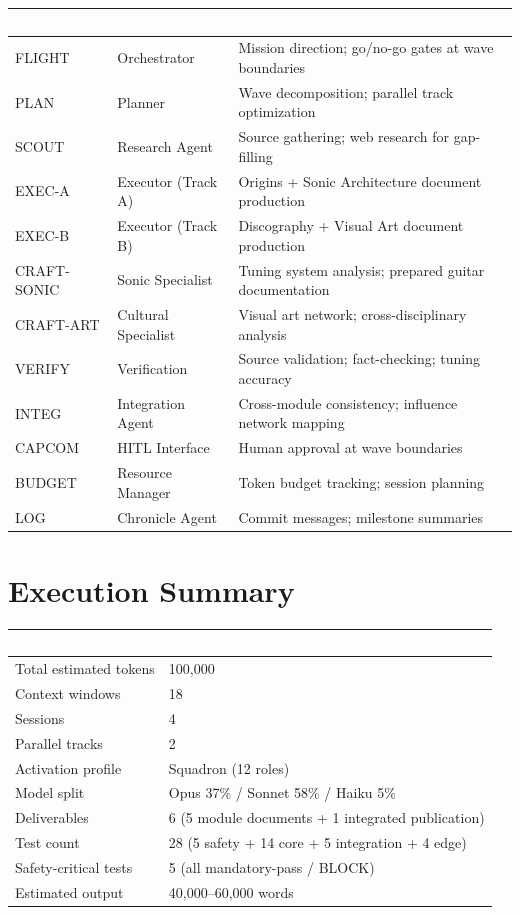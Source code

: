 \documentclass[11pt,letterpaper]{article}
\newcommand{\tableheader}[1]{\textbf{\sffamily\textcolor{white}{#1}}}
\begin{document}
\begin{center}
\begin{tabularx}{\textwidth}{L{2cm}L{3cm}X}
\toprule
{}
\tableheader{Role} & \tableheader{Agent} & \tableheader{Responsibility} \\
\midrule
FLIGHT & Orchestrator & Mission direction; go/no-go gates at wave boundaries \\
PLAN & Planner & Wave decomposition; parallel track optimization \\
SCOUT & Research Agent & Source gathering; web research for gap-filling \\
EXEC-A & Executor (Track A) & Origins + Sonic Architecture document production \\
EXEC-B & Executor (Track B) & Discography + Visual Art document production \\
CRAFT-SONIC & Sonic Specialist & Tuning system analysis; prepared guitar documentation \\
CRAFT-ART & Cultural Specialist & Visual art network; cross-disciplinary analysis \\
VERIFY & Verification & Source validation; fact-checking; tuning accuracy \\
INTEG & Integration Agent & Cross-module consistency; influence network mapping \\
CAPCOM & HITL Interface & Human approval at wave boundaries \\
BUDGET & Resource Manager & Token budget tracking; session planning \\
LOG & Chronicle Agent & Commit messages; milestone summaries \\
\bottomrule
\end{tabularx}
\end{center}

\section{Execution Summary}

\begin{center}
\begin{tabularx}{\textwidth}{L{5cm}X}
\toprule
{}
\tableheader{Metric} & \tableheader{Value} \\
\midrule
Total estimated tokens & 100,000 \\
Context windows & 18 \\
Sessions & 4 \\
Parallel tracks & 2 \\
Activation profile & Squadron (12 roles) \\
Model split & Opus 37\% / Sonnet 58\% / Haiku 5\% \\
Deliverables & 6 (5 module documents + 1 integrated publication) \\
Test count & 28 (5 safety + 14 core + 5 integration + 4 edge) \\
Safety-critical tests & 5 (all mandatory-pass / BLOCK) \\
Estimated output & 40,000--60,000 words \\
\bottomrule
\end{tabularx}
\end{center}
\end{document}
